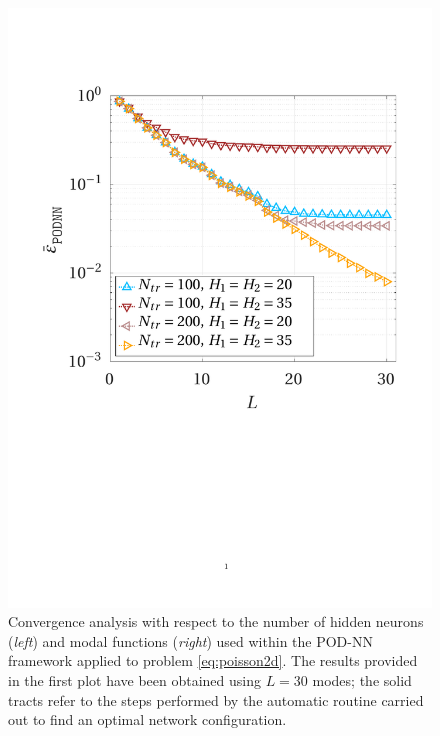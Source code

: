 \documentclass{elsarticle}
\numberwithin{equation}{section}
\theoremstyle{theorem}
\theoremstyle{definition}
\theoremstyle{remark}
\theoremstyle{proposition}
\numberwithin{figure}{section}
\begin{document}
\begin{figure}[t]
			\includegraphics[scale = 0.385, trim = {1.5cm 9.8cm 1.5cm 3.8cm}, clip]{poisson2d_3_nn_comparison}
						
			\caption{Convergence analysis with respect to the number of hidden neurons (\emph{left}) and modal functions (\emph{right}) used within the POD-NN framework applied to problem \eqref{eq:poisson2d}. The results provided in the first plot have been obtained using $L = 30$ modes; the solid tracts refer to the steps performed by the automatic routine carried out to find an optimal network configuration.}
			\label{fig:poisson2d-fig4}
		\end{figure}	
		
\end{document}
